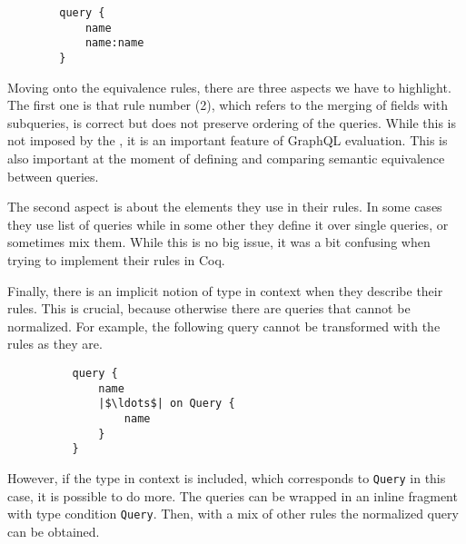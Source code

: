 \begin{verbatim}
        query {
            name
            name:name
        }
\end{verbatim}


Moving onto the equivalence rules, there are three aspects we have to highlight. The first one is that rule number (2), which refers to the merging of fields with subqueries, is correct but does not preserve ordering of the queries. While this is not imposed by the \spec{}, it is an important feature of GraphQL evaluation. This is also important at the moment of defining and comparing semantic equivalence between queries.

The second aspect is about the elements they use  in their rules. In some cases they use list of queries while in some other they define it over single queries, or sometimes mix them. While this is no big issue, it was a bit confusing when trying to implement their rules in Coq.

Finally, there is an implicit notion of type in context when they describe their rules. This is crucial, because otherwise there are queries that cannot be normalized. For example, the following query cannot be transformed with the rules as they are.
\begin{verbatim}
          query {
              name
              |$\ldots$| on Query {
                  name
              }
          }
\end{verbatim}
However, if the type in context is included, which corresponds to \texttt{Query} in this case, it is possible to do more. The queries can be wrapped in an inline fragment with type condition \texttt{Query}. Then, with a mix of other rules the normalized query can be obtained.

